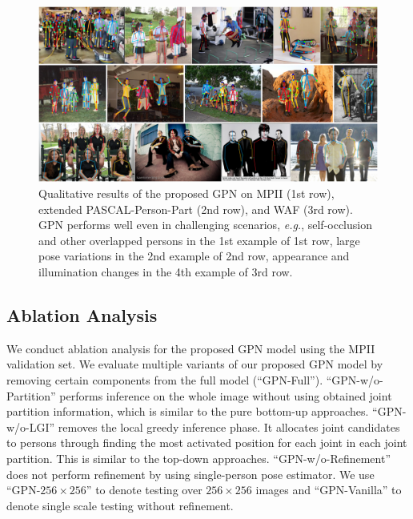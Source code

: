 \documentclass[10pt,twocolumn,letterpaper]{article}
\begin{document}
\begin{figure}[t!]
\begin{center}
\includegraphics[scale=0.725]{figs/vis_examples_new.pdf}
\caption{Qualitative results of the proposed GPN on  MPII (1st row), extended PASCAL-Person-Part  (2nd row), and  WAF (3rd row). GPN performs well  even in  challenging scenarios, \emph{e.g.}, self-occlusion and other overlapped persons  in the 1st example of 1st row,
large pose variations  in the 2nd example of 2nd row, appearance and illumination changes in the 4th example of  3rd row.}
\label{fig:mpi_vis}
\end{center}
\vspace{-20pt}
\end{figure}

\subsection{Ablation Analysis}

We conduct ablation analysis for the proposed GPN model using the  MPII validation set.  We evaluate multiple variants of our proposed GPN model by removing certain components from the full model (``GPN-Full'').  ``GPN-w/o-Partition''   performs inference on the whole image without using obtained joint partition information, which is similar to the pure bottom-up approaches.  ``GPN-w/o-LGI'' removes the local greedy inference phase. It allocates joint candidates to persons through finding the most activated  position for each  joint in each joint partition. This is similar to the top-down approaches.   ``GPN-w/o-Refinement'' does not perform refinement by using single-person pose estimator. We use ``GPN-$256{\times}256$'' to denote  testing over $256{\times}256$  images and ``GPN-Vanilla''  to denote single scale testing without refinement.
\end{document}
